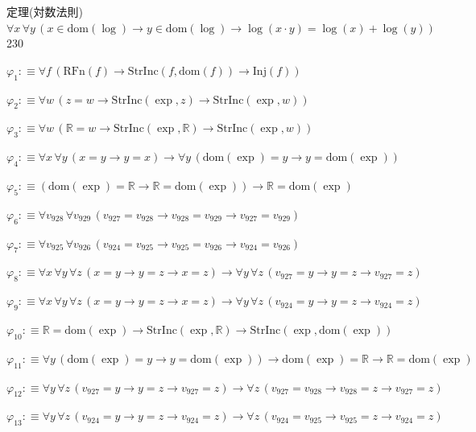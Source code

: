\begin{fullproof}{定理(対数法則)}{$\forall x\,\forall y\,(x \in \mathrm{dom}(\log) \to y \in \mathrm{dom}(\log) \to \log(x \cdot y) = \log(x) + \log(y))$}{230}
\begin{ptree}
\noLine
{}
\end{ptree}
\begin{abbrevlist}
\item $\varphi_{1} :\equiv \forall f\,(\mathrm{RFn}(f) \to \mathrm{StrInc}(f,\mathrm{dom}(f)) \to \mathrm{Inj}(f))$
\item $\varphi_{2} :\equiv \forall w\,(z = w \to \mathrm{StrInc}(\exp,z) \to \mathrm{StrInc}(\exp,w))$
\item $\varphi_{3} :\equiv \forall w\,(\mathbb{R} = w \to \mathrm{StrInc}(\exp,\mathbb{R}) \to \mathrm{StrInc}(\exp,w))$
\item $\varphi_{4} :\equiv \forall x\,\forall y\,(x = y \to y = x) \to \forall y\,(\mathrm{dom}(\exp) = y \to y = \mathrm{dom}(\exp))$
\item $\varphi_{5} :\equiv (\mathrm{dom}(\exp) = \mathbb{R} \to \mathbb{R} = \mathrm{dom}(\exp)) \to \mathbb{R} = \mathrm{dom}(\exp)$
\item $\varphi_{6} :\equiv \forall v_{928}\,\forall v_{929}\,(v_{927} = v_{928} \to v_{928} = v_{929} \to v_{927} = v_{929})$
\item $\varphi_{7} :\equiv \forall v_{925}\,\forall v_{926}\,(v_{924} = v_{925} \to v_{925} = v_{926} \to v_{924} = v_{926})$
\item $\varphi_{8} :\equiv \forall x\,\forall y\,\forall z\,(x = y \to y = z \to x = z) \to \forall y\,\forall z\,(v_{927} = y \to y = z \to v_{927} = z)$
\item $\varphi_{9} :\equiv \forall x\,\forall y\,\forall z\,(x = y \to y = z \to x = z) \to \forall y\,\forall z\,(v_{924} = y \to y = z \to v_{924} = z)$
\item $\varphi_{10} :\equiv \mathbb{R} = \mathrm{dom}(\exp) \to \mathrm{StrInc}(\exp,\mathbb{R}) \to \mathrm{StrInc}(\exp,\mathrm{dom}(\exp))$
\item $\varphi_{11} :\equiv \forall y\,(\mathrm{dom}(\exp) = y \to y = \mathrm{dom}(\exp)) \to \mathrm{dom}(\exp) = \mathbb{R} \to \mathbb{R} = \mathrm{dom}(\exp)$
\item $\varphi_{12} :\equiv \forall y\,\forall z\,(v_{927} = y \to y = z \to v_{927} = z) \to \forall z\,(v_{927} = v_{928} \to v_{928} = z \to v_{927} = z)$
\item $\varphi_{13} :\equiv \forall y\,\forall z\,(v_{924} = y \to y = z \to v_{924} = z) \to \forall z\,(v_{924} = v_{925} \to v_{925} = z \to v_{924} = z)$

\end{abbrevlist}
\end{fullproof}

